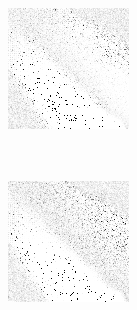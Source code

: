 \begin{figure}
	\begin{subfigure}[t]{0.22\textwidth}
		\includegraphics[width=\textwidth]{images/findings/round2/strats/random/crib_min_avg.png}
		\caption{\cribminavg}
	\end{subfigure}
	~
	\begin{subfigure}[t]{0.22\textwidth}
		\includegraphics[width=\textwidth]{images/findings/round2/strats/random/pegging_max_avg_gained.png}

\end{subfigure}
\end{figure}
